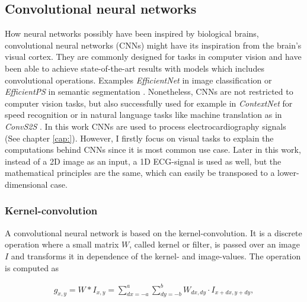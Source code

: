 


\subsection{Convolutional neural networks}\label{cap:convolution}
How neural networks possibly have been inspired by biological brains, convolutional neural networks (CNNs) might have its inspiration from the brain’s visual cortex. They are commonly designed for tasks in computer vision and have been able to achieve state-of-the-art results with models which includes convolutional operations. Examples \textit{EfficientNet} in image classification \cite{tan_efficientnet_2020} or \textit{EfficientPS} in semantic segmentation \cite{mohan_efficientps_2020}. Nonetheless, CNNs are not restricted to computer vision tasks, but also successfully used for example in \textit{ContextNet} for speed recognition \cite{han_contextnet_2020} or in natural language tasks like machine translation as in \textit{ConvS2S} \cite{edunov_classical_2018}. In this work CNNs are used to process electrocardiography signals (See chapter \ref{cap:}). However, I firstly focus on visual tasks to explain the computations behind CNNs since it is most common use case. Later in this work, instead of a 2D image as an input, a 1D ECG-signal is used as well, but the mathematical principles are the same, which can easily be transposed to a lower-dimensional case. 

\subsubsection{Kernel-convolution}
A convolutional neural network is based on the kernel-convolution. It is a discrete operation where a small matrix $W$, called kernel or filter, is passed over an image $I$ and transforms it in dependence of the kernel- and image-values. The operation is computed as 

\begin{align}
    g_{x,y}= W*I_{x,y}=\sum_{dx=-a}^a{\sum_{dy=-b}^b{W_{dx,dy}\cdot I_{x+dx,y+dy}}},
\end{align}


